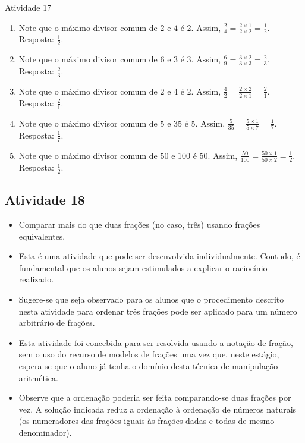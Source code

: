 \begin{multicols}{2}
\begin{resposta*}{Atividade 17}
\begin{enumerate}
 \item Note que o máximo divisor comum de   $2$   e   $4$   é 2. Assim,
$\frac{2}{4} = \frac{2 \times 1}{2 \times 2} = \frac{1}{2}$. Resposta:
$\frac{1}{2}$.
 \item Note que o máximo divisor comum de   $6$   e   $3$   é 3. Assim,
$\frac{6}{9} = \frac{3 \times 2}{3 \times 3} = \frac{2}{3}$. Resposta:
$\frac{2}{3}$.
 \item Note que o máximo divisor comum de   $2$   e   $4$   é 2. Assim,
$\frac{4}{2} = \frac{2 \times 2}{2 \times 1} = \frac{2}{1}$. Resposta:
$\frac{2}{1}$.
 \item Note que o máximo divisor comum de   $5$   e   $35$   é 5. Assim,
$\frac{5}{35} = \frac{5 \times 1}{5 \times 7} = \frac{1}{7}$. Resposta:
$\frac{1}{7}$.
 \item Note que o máximo divisor comum de   $50$   e   $100$   é 50. Assim,
$\frac{50}{100} = \frac{50 \times 1}{50 \times 2} = \frac{1}{2}$. Resposta:
$\frac{1}{2}$.
\end{enumerate}

\end{resposta*}



\subsection{Atividade 18}

\begin{itemize} %
    \item       Comparar mais do que duas frações (no caso, três) usando frações
equivalentes.
\end{itemize} %



\begin{itemize} %
    \item       Esta é uma atividade que pode ser desenvolvida individualmente.
Contudo, é fundamental que os alunos sejam estimulados a explicar o raciocínio
realizado.
    \item       Sugere-se que seja observado para os alunos que o procedimento
descrito nesta atividade para ordenar três frações pode ser aplicado para um
número arbitrário de frações.
    \item       Esta atividade foi concebida para ser resolvida usando a notação
de fração, sem o uso do recurso de modelos de frações uma vez que, neste
estágio, espera-se que o aluno já tenha o domínio desta técnica de manipulação
aritmética.
    \item       Observe que a ordenação poderia ser feita comparando-se duas
frações por vez. A solução indicada reduz a ordenação à ordenação de números
naturais (os numeradores das frações iguais às frações dadas e todas de mesmo
denominador).
\end{itemize} %



\end{multicols}
